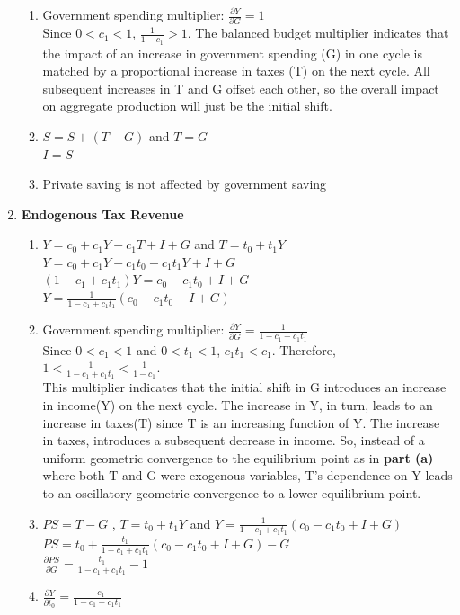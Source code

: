 \documentclass[a4paper, 11pt]{article}
\begin{document}
\begin{enumerate}[label=\textbf{(\alph*)}]
\begin{enumerate}[label=\textbf{\arabic*.}]
\item  Government spending multiplier: $\frac{\partial Y}{\partial G} = 1$\\

Since $0<c_1<1$, $\frac{1}{1-c_1} > 1$. The balanced budget multiplier indicates  that the impact of an increase in government spending (G) in one cycle is matched by a proportional increase in taxes (T) on the next cycle. All subsequent increases in T and G offset each other, so the overall impact on aggregate production will just be the initial shift. \\

\item $S = S + (T-G)$ and $T=G$\\

$ I = S $\\
\item Private saving is not affected by government saving
\end{enumerate}
\item \textbf{Endogenous Tax Revenue}
\begin{enumerate}[label=\textbf{\arabic*.}]
\item $Y = c_0 + c_1Y-c_1T + I +G$ and $T= t_0 + t_1Y$\\

$Y = c_0 + c_1Y-c_1t_0 - c_1t_1Y + I +G$\\
$(1-c_1+c_1t_1)Y = c_0 -c_1t_0+ I +G$\\
$Y = \frac{1}{1-c_1+c_1t_1} (c_0 - c_1t_0 + I + G )$\\
\item  Government spending multiplier: $\frac{\partial Y}{\partial G} = \frac{1}{1-c_1+c_1t_1}$\\

Since $ 0 < c_1 < 1$ and $0 < t_1 < 1$, $c_1t_1 < c_1$. Therefore, $1< \frac{1}{1-c_1+c_1t_1} <\frac{1}{1-c_1}$. \\ 

This multiplier indicates that the initial shift in G introduces an increase in income(Y) on the next cycle. The increase in Y, in turn, leads to an increase in taxes(T) since T is an increasing function of Y. The increase in taxes, introduces a subsequent decrease in income. So, instead of a uniform geometric convergence to the equilibrium point as in \textbf{part (a) }where both T and G were exogenous variables, T's dependence on Y leads to an oscillatory geometric convergence to a lower equilibrium point.
\item $PS = T - G$ , $T= t_0 + t_1Y$ and $Y = \frac{1}{1-c_1+c_1t_1} (c_0 - c_1t_0 + I + G )$\\

$ PS = t_0 + \frac{t_1}{1-c_1+c_1t_1} (c_0 - c_1t_0 + I + G ) - G$\\

$\frac{\partial PS}{\partial G} =\frac{t_1}{1-c_1+c_1t_1} - 1$\\

\item $\frac{\partial Y}{\partial t_0} =\frac{-c_1}{1-c_1+c_1t_1}$
\end{enumerate}
\end{enumerate}
\end{document}
